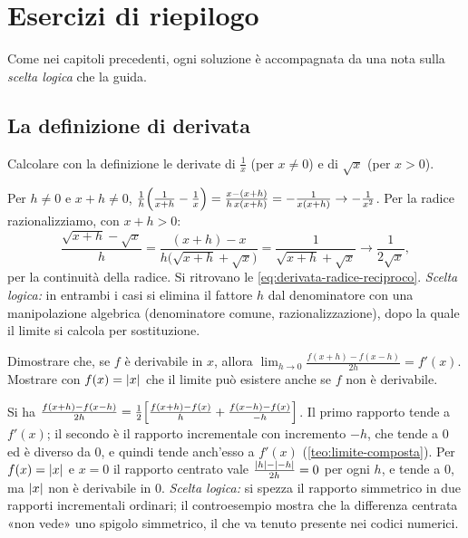 \section{Esercizi di riepilogo}
\label{sec:esercizi-cap5}

Come nei capitoli precedenti, ogni soluzione è accompagnata da una nota sulla
\emph{scelta logica} che la guida.

\subsection*{La definizione di derivata}

\begin{esercizio}\label{es:derivata-definizione}
Calcolare con la definizione le derivate di $\frac1x$ (per $x\neq0$) e di $\sqrt x$ (per
$x>0$).
\begin{soluzione}
Per $h\neq0$ e $x+h\neq0$,
$\frac1h\Bigl(\frac1{x+h}-\frac1x\Bigr)=\frac{x-(x+h)}{h\,x(x+h)}=-\frac1{x(x+h)}\to-\frac1{x^{2}}$.
Per la radice razionalizziamo, con $x+h>0$:
\[
  \frac{\sqrt{x+h}-\sqrt x}{h}=\frac{(x+h)-x}{h\bigl(\sqrt{x+h}+\sqrt x\bigr)}
  =\frac1{\sqrt{x+h}+\sqrt x}\to\frac1{2\sqrt x},
\]
per la continuità della radice. Si ritrovano le \eqref{eq:derivata-radice-reciproco}.
\emph{Scelta logica:} in entrambi i casi si elimina il fattore $h$ dal denominatore con
una manipolazione algebrica (denominatore comune, razionalizzazione), dopo la quale il
limite si calcola per sostituzione.
\end{soluzione}
\end{esercizio}

\begin{esercizio}\label{es:differenza-centrata}
Dimostrare che, se $f$ è derivabile in $x$, allora
$\displaystyle\lim_{h\to0}\frac{f(x+h)-f(x-h)}{2h}=f'(x)$. Mostrare con $f(x)=\lvert x\rvert$ che il
limite può esistere anche se $f$ non è derivabile.
\begin{soluzione}
Si ha
$\frac{f(x+h)-f(x-h)}{2h}=\frac12\Bigl[\frac{f(x+h)-f(x)}{h}+\frac{f(x-h)-f(x)}{-h}\Bigr]$.
Il primo rapporto tende a $f'(x)$; il secondo è il rapporto incrementale con incremento
$-h$, che tende a $0$ ed è diverso da $0$, e quindi tende anch'esso a $f'(x)$
(\cref{teo:limite-composta}). Per $f(x)=\lvert x\rvert$ e $x=0$ il rapporto centrato vale
$\frac{\lvert h\rvert-\lvert -h\rvert}{2h}=0$ per ogni $h$, e tende a $0$, ma $\lvert x\rvert$ non è derivabile in $0$.
\emph{Scelta logica:} si spezza il rapporto simmetrico in due rapporti incrementali
ordinari; il controesempio mostra che la differenza centrata «non vede» uno spigolo
simmetrico, il che va tenuto presente nei codici numerici.
\end{soluzione}
\end{esercizio}

